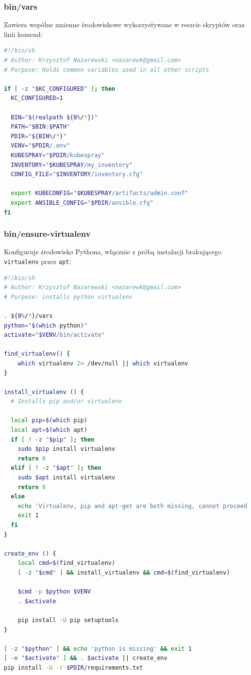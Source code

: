 \documentclass[a4paper,12pt,twoside,openany]{report}
\newcommand{\passthrough}[1]{#1}
\begin{document}
\hypertarget{binvars}{%
\subsubsection{bin/vars}\label{binvars}}

Zawiera wspólne zmienne środowiskowe wykorzystywane w reszcie skryptów
oraz linii komend:

\begin{lstlisting}[language=bash]
#!/bin/sh
# Author: Krzysztof Nazarewski <nazarewk@gmail.com>
# Purpose: Holds common variables used in all other scripts

if [ -z "$KC_CONFIGURED" ]; then
  KC_CONFIGURED=1

  BIN="$(realpath ${0%/*})"
  PATH="$BIN:$PATH"
  PDIR="${BIN%/*}"
  VENV="$PDIR/.env"
  KUBESPRAY="$PDIR/kubespray"
  INVENTORY="$KUBESPRAY/my_inventory"
  CONFIG_FILE="$INVENTORY/inventory.cfg"

  export KUBECONFIG="$KUBESPRAY/artifacts/admin.conf"
  export ANSIBLE_CONFIG="$PDIR/ansible.cfg"
fi
\end{lstlisting}

\hypertarget{binensure-virtualenv}{%
\subsubsection{bin/ensure-virtualenv}\label{binensure-virtualenv}}

Konfiguruje środowisko Pythona, włącznie z próbą instalacji brakującego
\passthrough{\lstinline!virtualenv!} przez
\passthrough{\lstinline!apt!}:

\begin{lstlisting}[language=bash]
#!/bin/sh
# Author: Krzysztof Nazarewski <nazarewk@gmail.com>
# Purpose: installs python virtualenv

. ${0%/*}/vars
python="$(which python)"
activate="$VENV/bin/activate"

find_virtualenv() {
    which virtualenv 2> /dev/null || which virtualenv
}

install_virtualenv () {
  # Installs pip and/or virtualenv

  local pip=$(which pip)
  local apt=$(which apt)
  if [ ! -z "$pip" ]; then
    sudo $pip install virtualenv
    return 0
  elif [ ! -z "$apt" ]; then
    sudo $apt install virtualenv
    return 0
  else
    echo 'Virtualenv, pip and apt-get are both missing, cannot proceed'
    exit 1
  fi
}

create_env () {
    local cmd=$(find_virtualenv)
    [ -z "$cmd" ] && install_virtualenv && cmd=$(find_virtualenv)

    $cmd -p $python $VENV
    . $activate

    pip install -U pip setuptools
}

[ -z "$python" ] && echo 'python is missing' && exit 1
[ -e "$activate" ] && . $activate || create_env
pip install -U -r $PDIR/requirements.txt
\end{lstlisting}
\end{document}
